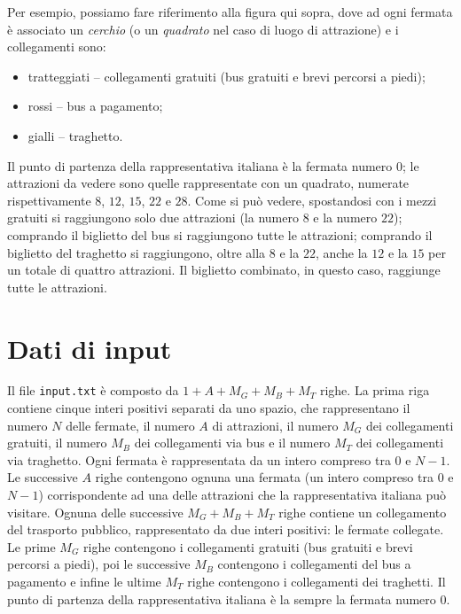 \documentclass[a4paper,11pt]{article}
\begin{document}
Per esempio, possiamo fare riferimento alla figura qui sopra, dove ad
ogni fermata è associato un \emph{cerchio} (o un \emph{quadrato} nel
caso di luogo di attrazione) e i collegamenti sono:

\begin{itemize}[nolistsep, noitemsep]
  \item tratteggiati -- collegamenti gratuiti (bus gratuiti e brevi
    percorsi a piedi);
  \item rossi -- bus a pagamento;
  \item gialli -- traghetto.
\end{itemize}

\noindent
Il punto di partenza della rappresentativa italiana è la fermata
numero $0$; le attrazioni da vedere sono quelle rappresentate con un
quadrato, numerate rispettivamente $8$, $12$, $15$, $22$ e $28$.  Come
si può vedere, spostandosi con i mezzi gratuiti si raggiungono solo
due attrazioni (la numero $8$ e la numero $22$); comprando il
biglietto del bus si raggiungono tutte le attrazioni; comprando il
biglietto del traghetto si raggiungono, oltre alla $8$ e la $22$,
anche la $12$ e la $15$ per un totale di quattro attrazioni. Il
biglietto combinato, in questo caso, raggiunge tutte le attrazioni.

\section*{Dati di input}
Il file \verb'input.txt' è composto da $1+A+M_G+M_B+M_T$ righe. La
prima riga contiene cinque interi positivi separati da uno spazio, che
rappresentano il numero $N$ delle fermate, il numero $A$ di
attrazioni, il numero $M_G$ dei collegamenti gratuiti, il numero $M_B$
dei collegamenti via bus e il numero $M_T$ dei collegamenti via
traghetto.  Ogni fermata è rappresentata da un intero compreso tra $0$
e $N-1$.  Le successive $A$ righe contengono ognuna una fermata (un
intero compreso tra $0$ e $N-1$) corrispondente ad una delle
attrazioni che la rappresentativa italiana può visitare.  Ognuna delle
successive $M_G+M_B+M_T$ righe contiene un collegamento del trasporto
pubblico, rappresentato da due interi positivi: le fermate collegate.
Le prime $M_G$ righe contengono i collegamenti gratuiti (bus gratuiti
e brevi percorsi a piedi), poi le successive $M_B$ contengono i
collegamenti del bus a pagamento e infine le ultime $M_T$ righe
contengono i collegamenti dei traghetti.  Il punto di partenza della
rappresentativa italiana è la sempre la fermata numero $0$.
\end{document}
